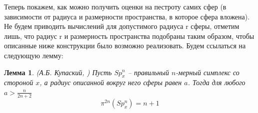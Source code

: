 \documentclass{report}%
\newtheorem{lemma}[theorem]{Лемма}
\begin{document}
Теперь покажем, как можно получить оценки на пестроту самих сфер (в зависимости от радиуса и размерности пространства, в которое сфера вложена). Не будем приводить вычислений для допустимого радиуса r сферы, отметим лишь, что радиус r и размерность пространства подобраны таким образом, чтобы описанные ниже конструкции было возможно реализовать.  Будем ссылаться на следующую лемму:

\begin{lemma} (А.Б. Купаский, \cite{Kupavsky2011})
		Пусть $Sp_x^n$ – правильный $n$-мерный симплекс со стороной $x$,
		а радиус описанной вокруг него сферы равен $a$. Тогда для любого $a > \frac{n}{2n + 2}$
		\begin{equation}
				\pi^{2n}(Sp_x^n) = n+1
		\end{equation}
\end{lemma}
\end{document}
